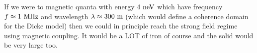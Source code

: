 \documentclass[
]{article}
\renewcommand{\[}{\begin{equation}}
\renewcommand{\]}{\end{equation}}
\begin{document}
If we were to magnetic quanta with energy \(4 \ \rm neV\) which have
frequency \(f \approx 1 \ \rm MHz\) and wavelength
\(\lambda \approx 300 \ \rm  m\) (which would define a coherence domain
for the Dicke model) then we could in principle reach the strong field
regime using magnetic coupling. It would be a LOT of iron of course and
the solid would be very large too.

\printbibliography
\end{document}
